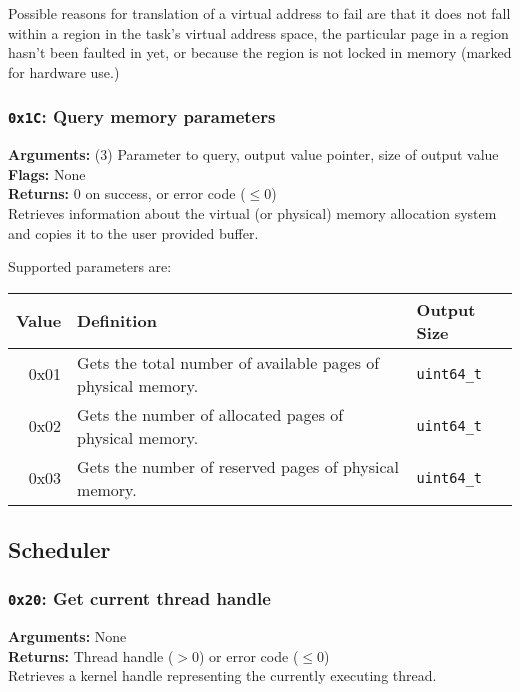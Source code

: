 \documentclass[11pt]{article}
\begin{document}
Possible reasons for translation of a virtual address to fail are that it does not fall within a region in the task's virtual address space, the particular page in a region hasn't been faulted in yet, or because the region is not locked in memory (marked for hardware use.)

\subsubsection{{\tt 0x1C}: Query memory parameters}
\textbf{Arguments:} (3) Parameter to query, output value pointer, size of output value \\
\textbf{Flags:} None \\
\textbf{Returns:} 0 on success, or error code ($\leq0$) \\

Retrieves information about the virtual (or physical) memory allocation system and copies it to the user provided buffer.

Supported parameters are:

\begin{table}[h]
\begin{tabular}{|r|l|l|}
\hline
\rowcolor[HTML]{EFEFEF}
\textbf{Value} & \textbf{Definition} & \textbf{Output Size} \\ \hline
0x01 & Gets the total number of available pages of physical memory. & \texttt{uint64\_t} \\ \hline
0x02 & Gets the number of allocated pages of physical memory. & \texttt{uint64\_t} \\ \hline
0x03 & Gets the number of reserved pages of physical memory. & \texttt{uint64\_t} \\ \hline
\end{tabular}
\end{table}


\newpage
\subsection{Scheduler}
\subsubsection{{\tt 0x20}: Get current thread handle}
\textbf{Arguments:} None \\
\textbf{Returns:} Thread handle ($>0$) or error code ($\leq0$) \\

Retrieves a kernel handle representing the currently executing thread.
\end{document}

